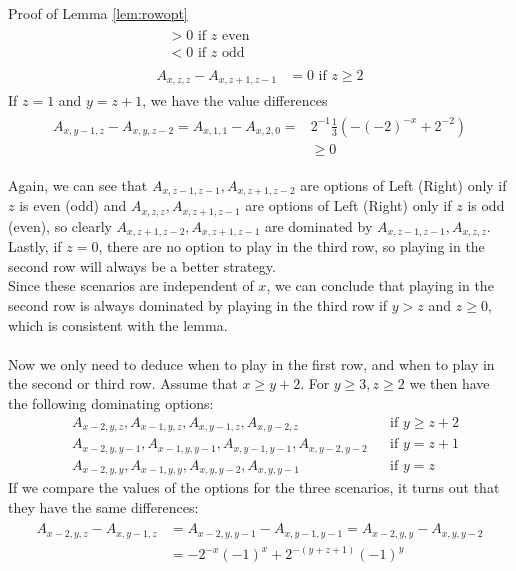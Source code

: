\begin{proof2}{Proof of Lemma \ref{lem:rowopt}}
\begin{align*}
\begin{split}
&>0\text{ if $z$ even}\\
&<0\text{ if $z$ odd}
\end{split}\\
\begin{split}
A_{x,z,z}-A_{x,z+1,z-1}&=0\text{ if $z\ge2$}
\end{split}
\end{align*}
If $z=1$ and $y=z+1$, we have the value differences
\begin{align*}
\begin{split}
A_{x,y-1,z}-A_{x,y,z-2}=A_{x,1,1}-A_{x,2,0}=&2^{-1}\frac{1}{3}\left(-(-2)^{-x}+2^{-2}\right)\\
&\ge0
\end{split}
\end{align*}

Again, we can see that $A_{x,z-1,z-1},A_{x,z+1,z-2}$ are options of Left (Right) only if $z$ is even (odd) and $A_{x,z,z},A_{x,z+1,z-1}$ are options of Left (Right) only if $z$ is odd (even), so clearly $A_{x,z+1,z-2},A_{x,z+1,z-1}$ are dominated by $A_{x,z-1,z-1},A_{x,z,z}$.
\\
Lastly, if $z=0$, there are no option to play in the third row, so playing in the second row will always be a better strategy. 
\\
Since these scenarios are independent of $x$, we can conclude that playing in the second row is always dominated by playing in the third row if $y>z$ and $z\ge0$, which is consistent with the lemma.
\\\\
Now we only need to deduce when to play in the first row, and when to play in the second or third row. Assume that $x\ge y+2$. For $y\ge3,z\ge2$ we then have the following dominating options:
\begin{align*}
&A_{x-2,y,z},A_{x-1,y,z},A_{x,y-1,z},A_{x,y-2,z}&&\text{if $y\ge z+2$}\\
&A_{x-2,y,y-1},A_{x-1,y,y-1},A_{x,y-1,y-1},A_{x,y-2,y-2}&&\text{if $y=z+1$}\\
&A_{x-2,y,y},A_{x-1,y,y},A_{x,y,y-2},A_{x,y,y-1}&&\text{if $y=z$}
\end{align*}
If we compare the values of the options for the three scenarios, it turns out that they have the same differences:
\begin{align*}
\begin{split}
A_{x-2,y,z}-A_{x,y-1,z}&=A_{x-2,y,y-1}-A_{x,y-1,y-1}=A_{x-2,y,y}-A_{x,y,y-2}\\
&=-2^{-x}(-1)^x+2^{-(y+z+1)}(-1)^y\\

\end{split}
\end{align*}
\end{proof2}
